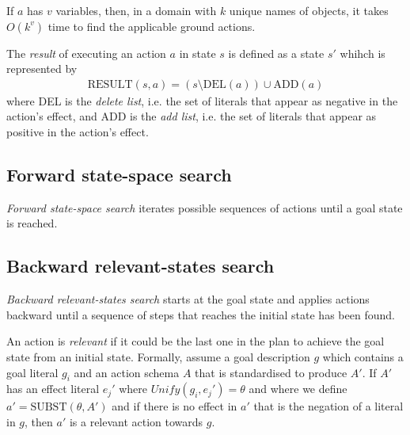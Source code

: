 \documentclass{article}
\begin{document}
\begin{lemma}
    If $a$ has $v$ variables, then, in a domain with $k$ unique names of objects,
    it takes $O(k^v)$ time to find the applicable ground actions.
\end{lemma}

\begin{definition}
    The \emph{result} of executing an action $a$ in state $s$ is defined
    as a state $s'$ whihch is represented by
    \begin{align*}
        \text{RESULT}(s,a)=(s\setminus\text{DEL}(a))\cup\text{ADD}(a)
    \end{align*}
    where DEL is the \emph{delete list}, i.e. the set of literals that appear
    as negative in the action's effect, and ADD is the \emph{add list}, i.e.
    the set of literals that appear as positive in the action's effect.
\end{definition}

\subsection{Forward state-space search}

\begin{definition}
    \emph{Forward state-space search} iterates possible sequences of actions until
    a goal state is reached.
\end{definition}

\subsection{Backward relevant-states search}

\begin{definition}
    \emph{Backward relevant-states search} starts at the goal state and applies
    actions backward until a sequence of steps that reaches the initial state has
    been found.
\end{definition}

\begin{definition}
    An action is \emph{relevant} if it could be the last one in the plan to achieve
    the goal state from an initial state. Formally, assume a goal description $g$
    which contains a goal literal $g_i$ and an action schema $A$ that is standardised
    to produce $A'$. If $A'$ has an effect literal $e_j'$ where $Unify(g_i,e_j')=\theta$
    and where we define $a'=\text{SUBST}(\theta, A')$ and if there is no effect in
    $a'$ that is the negation of a literal in $g$, then $a'$ is a relevant action towards 
    $g$. 
\end{definition}
\end{document}
